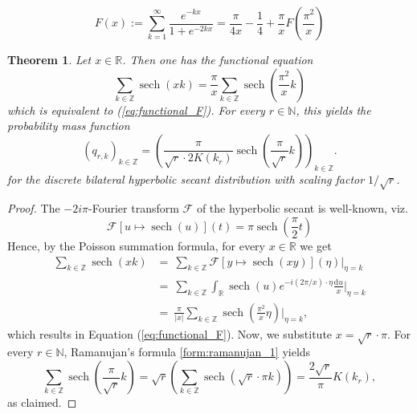 \documentclass[10pt,a4paper]{amsart}
\newtheorem{theorem}{Theorem}
\begin{document}
\begin{equation}\label{eq:functional_F}
F(x) := \sum_{k=1}^\infty \frac{e^{-kx}}{1 + e^{-2kx}} =  \frac{\pi}{4x} - \frac{1}{4} + \frac{\pi}{x}F\left(\frac{\pi^2}{x}\right)
\end{equation}

\begin{theorem}
Let $x \in \mathbb{R}$. Then one has the functional equation
\begin{equation}
\sum_{k \in \mathbb{Z}} \operatorname{sech}\left(xk\right) = \frac{\pi}{x} \sum_{k \in \mathbb{Z}} \operatorname{sech}\left(\frac{\pi^2}{x} k \right)
\end{equation}
which is equivalent to (\ref{eq:functional_F}). For every $r \in \mathbb{N}$, this yields the probability mass function
$$
\left(q_{r,k} \right)_{k \in \mathbb{Z}} = \left(\frac{\pi}{\sqrt{r} \cdot 2K(k_r)} \operatorname{sech}\left( \frac{\pi}{\sqrt{r}} k \right) \right)_{k \in \mathbb{Z}}.
$$
for the discrete bilateral hyperbolic secant distribution with scaling factor $1/\sqrt{r}$.
\end{theorem}

\begin{proof}
The $-2i \pi$-Fourier transform $\mathcal{F}$ of the hyperbolic secant is well-known, viz.
$$
\mathcal{F}[u \mapsto \operatorname{sech}(u)](t) = \pi \operatorname{sech} \left(\frac{\pi}{2}t\right)
$$
Hence, by the Poisson summation formula, for every $x \in \mathbb{R}$ we get
\begin{align*}
\sum_{k \in \mathbb{Z}} \operatorname{sech}(xk) &=\ \sum_{k \in \mathbb{Z}} \mathcal{F}\left[y \mapsto \operatorname{sech}(xy)\right](\eta)\big|_{\eta = k}\\
&=\ \sum_{k\in \mathbb{Z}} \int_\mathbb{R} \operatorname{sech}(u) e^{-i(2\pi/x) \cdot \eta} \frac{\mathrm{d}u}{x}\big|_{\eta = k}\\
&=\ \frac{\pi}{|x|} \sum_{k \in \mathbb{Z}} \operatorname{sech}\left(\frac{\pi^2}{x}\eta\right) \big|_{\eta = k},
\end{align*}
which results in Equation (\ref{eq:functional_F}). Now, we substitute $x = \sqrt{r} \cdot \pi$. For every $r \in \mathbb{N}$, Ramanujan's formula \ref{form:ramanujan_1} yields
$$
\sum_{k\in \mathbb{Z}} \operatorname{sech}\left(\frac{\pi}{\sqrt{r}} k \right) = \sqrt{r} \left(\sum_{k \in \mathbb{Z}} \operatorname{sech}\left(\sqrt{r} \cdot \pi k \right)\right) = \frac{2\sqrt{r}}{\pi}K\left(k_r\right),
$$
as claimed.
\end{proof}
\end{document}
